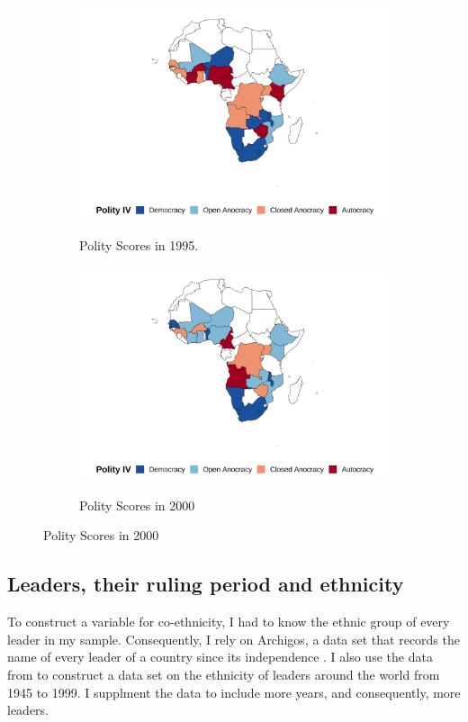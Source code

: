 \documentclass{wptemp}
\begin{document}
\begin{figure}[!htb]
\begin{subfigure}{.48\textwidth}
\label{fig1990}
\end{subfigure}
\begin{subfigure}{.48\textwidth}
\centering
\caption{Polity Scores in 1995.}
\includegraphics[width=.9\linewidth]{figure/1995.png}
\label{fig1995}
\end{subfigure}
\begin{subfigure}{.9\textwidth}
\centering
\caption{Polity Scores in 2000}
\includegraphics[width=.5\linewidth]{figure/2000.png}
\label{fig2000}
\end{subfigure}


\end{figure}

\subsection{Leaders, their ruling period and ethnicity}
To construct a variable for co-ethnicity, I had to know the ethnic group of every leader in my sample. Consequently, I rely on Archigos, a data set that records the name of every leader of a country since its independence \citep{goemans2006archigos}. I also use the data from \citet{fearon2007ethnic} to construct a data set on the ethnicity of leaders around the world from 1945 to 1999. I supplment \citet{fearon2007ethnic} the data to include more years, and consequently, more leaders.
\end{document}
